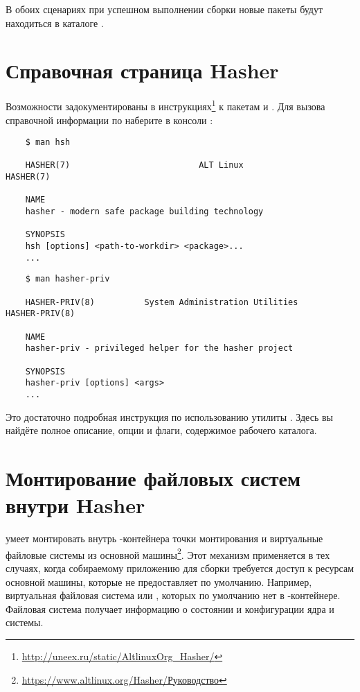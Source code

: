 В обоих сценариях при успешном выполнении сборки новые пакеты будут находиться в каталоге . 


\section{Справочная страница Hasher}
Возможности  задокументированы в инструкциях\footnote{\href{http://uneex.ru/static/AltlinuxOrg_Hasher/}{http://uneex.ru/static/AltlinuxOrg\_Hasher/}} к пакетам  и . Для вызова справочной информации по  наберите в консоли :
\begin{verbatim}
	$ man hsh
	
	HASHER(7)                          ALT Linux                         HASHER(7)
	
	NAME
	hasher - modern safe package building technology
	
	SYNOPSIS
	hsh [options] <path-to-workdir> <package>...
	...
\end{verbatim} 

\begin{verbatim}
	$ man hasher-priv
	
	HASHER-PRIV(8)          System Administration Utilities         HASHER-PRIV(8)
	
	NAME
	hasher-priv - privileged helper for the hasher project
	
	SYNOPSIS
	hasher-priv [options] <args>
	...
\end{verbatim}

Это достаточно подробная инструкция по использованию утилиты . Здесь вы найдёте полное описание, опции и флаги, содержимое рабочего каталога. 


\hypertarget{1.3}{\section{Монтирование файловых систем внутри Hasher}}
 умеет монтировать внутрь -контейнера точки монтирования и виртуальные файловые системы из основной машины\footnote{\href{https://www.altlinux.org/Hasher/\%D0\%A0\%D1\%83\%D0\%BA\%D0\%BE\%D0\%B2\%D0\%BE\%D0\%B4\%D1\%81\%D1\%82\%D0\%B2\%D0\%BE\#\%D0\%9C\%D0\%BE\%D0\%BD\%D1\%82\%D0\%B8\%D1\%80\%D0\%BE\%D0\%B2\%D0\%B0\%D0\%BD\%D0\%B8\%D0\%B5_\%D1\%84\%D0\%B0\%D0\%B9\%D0\%BB\%D0\%BE\%D0\%B2\%D1\%8B\%D1\%85_\%D1\%81\%D0\%B8\%D1\%81\%D1\%82\%D0\%B5\%D0\%BC_\%D0\%B2\%D0\%BD\%D1\%83\%D1\%82\%D1\%80\%D0\%B8_hasher}{https://www.altlinux.org/Hasher/Руководство}}. Этот механизм применяется в тех случаях, когда собираемому приложению для сборки требуется доступ к ресурсам основной машины, которые  не предоставляет по умолчанию. Например, виртуальная файловая система  или , которых по умолчанию нет в -контейнере. Файловая система  получает информацию о состоянии и конфигурации ядра и системы.

